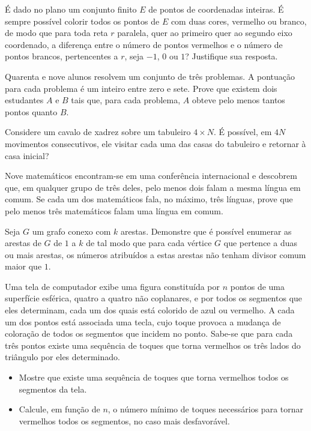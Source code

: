 \begin{questao}
  É dado no plano um conjunto finito $E$ de pontos de coordenadas
  inteiras. É sempre possível colorir todos os pontos de $E$ com
  duas cores, vermelho ou branco, de modo que para toda reta $r$
  paralela, quer ao primeiro quer ao segundo eixo coordenado, a
  diferença entre o número de pontos vermelhos e o número de pontos
  brancos, pertencentes a $r$, seja $-1$, $0$ ou $1$?
  Justifique sua resposta.  
\end{questao}

\begin{questao}
  Quarenta e nove alunos resolvem um conjunto de três problemas. A
  pontuação para cada problema é um inteiro entre zero e sete. Prove
  que existem dois estudantes $A$ e $B$ tais que, para cada
  problema, $A$ obteve pelo menos tantos pontos quanto $B$.
\end{questao}

\begin{questao}
  Considere um cavalo de xadrez sobre um tabuleiro $4 \times N$. É
  possível, em $4N$ movimentos consecutivos, ele visitar cada uma
  das casas do tabuleiro e retornar à casa inicial?
\end{questao}

\begin{questao}
  Nove matemáticos encontram-se em uma conferência internacional e
  descobrem que, em qualquer grupo de três deles, pelo menos dois
  falam a mesma língua em comum. Se cada um dos matemáticos fala, no
  máximo, três línguas, prove que pelo menos três matemáticos falam
  uma língua em comum.
\end{questao}

\begin{questao}
  Seja $G$ um grafo conexo com $k$ arestas. Demonstre que é
  possível enumerar as arestas de $G$ de $1$ a $k$ de tal modo
  que para cada vértice $G$ que pertence a duas ou mais arestas, os
  números atribuídos a estas arestas não tenham divisor comum maior
  que $1$.
\end{questao}

\begin{questao}
  Uma tela de computador exibe uma figura constituída por $n$ pontos
  de uma superfície esférica, quatro a quatro não coplanares, e por
  todos os segmentos que eles determinam, cada um dos quais está
  colorido de azul ou vermelho. A cada um dos pontos está associada
  uma tecla, cujo toque provoca a mudança de coloração de todos os
  segmentos que incidem no ponto. Sabe-se que para cada três pontos
  existe uma sequência de toques que torna vermelhos os três lados do
  triângulo por eles determinado.

  \begin{itemize}
    \item Mostre que existe uma sequência de toques que torna
    vermelhos todos os segmentos da tela.

    \item Calcule, em função de $n$, o número mínimo de toques
    necessários para tornar vermelhos todos os segmentos, no caso mais
    desfavorável.
  \end{itemize}
\end{questao}

